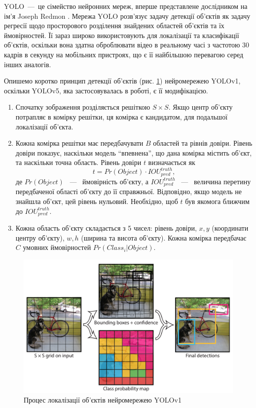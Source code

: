 YOLO~---~це сімейство нейронних мереж, вперше представлене дослідником на ім'я Joseph Redmon \cite{bib:yolov1}.
Мережа YOLO розв'язує задачу детекції об'єктів як задачу регресії
щодо просторового розділення знайдених областей об'єктів та їх
ймовірностей. Її зараз широко використовують для локалізації та класифікації об'єктів,
оскільки вона здатна оброблювати відео в реальному часі з частотою 30 кадрів в секунду
на мобільних пристроях, що є її найбільшою перевагою серед інших аналогів.

Опишемо коротко принцип детекції об'єктів (рис. \ref{fig:yolov1:detection_process}) нейромережею YOLOv1,
оскільки YOLOv5, яка застосовувалась в роботі, є її модифікацією.
\begin{enumerate}
    \item Спочатку зображення розділяється решіткою $S \times S$.
          Якщо центр об'єкту потрапляє в комірку решітки, ця комірка
          є кандидатом, для подальшої локалізації об'єкта.
    \item Кожна комірка решітки має передбачувати $B$ областей та рівнів
          довіри. Рівень довіри показує, наскільки модель ``впевнена'',
          що дана комірка містить об'єкт, та наскільки точна область.
          Рівень довіри $t$ визначається  як
          \begin{equation*}
              t = Pr(Object) \cdot {IOU}_{pred}^{truth},
          \end{equation*}
          де $Pr(Object)$ ~---~ ймовірність об'єкту, а ${IOU}_{pred}^{truth}$ ~---~ величина
          перетину передбаченої області об'єкту до її справжньої.
          Відповідно, якщо модель не знайшла об'єкт, цей рівень нульовий.
          Необхідно, щоб $t$ був якомога ближчим до ${IOU}_{pred}^{truth}$.
    \item Кожна область об'єкту складається з 5 чисел: рівень довіри,
          $x, y$ (координати центру об'єкту),  $w, h$ (ширина та висота об'єкту).
          Кожна комірка передбачає $C$ умовних ймовірностей $Pr(Class_i|Object)$.
\end{enumerate}

\begin{figure}[H]
    \includegraphics[width=0.5\linewidth]{images/cnn_yolo1}
    \centering
    \caption{Процес локалізації об'єктів нейромережею YOLOv1 \cite{bib:yolov1}
        \label{fig:yolov1:detection_process}
    }
\end{figure}

